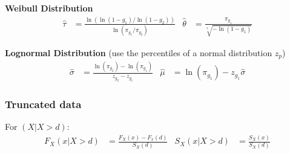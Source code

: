 \documentclass[10pt, french]{article}
\begin{document}
\begin{multicols*}{2}
\textbf{Weibull Distribution}
\begin{align*}
	\hat{\tau}
	&=	\frac{\ln\left(\ln(1 - g_{1})/\ln(1 - g_{2})\right)}{\ln(\pi_{g_{1}}/\pi_{g_{2}})}	&
	\hat{\theta}
	&=	\frac{\pi_{g_{1}}}{\sqrt[\hat{\tau}]{-\ln(1 - g_{1})}}
\end{align*}

\textbf{Lognormal Distribution} (use the percentiles of a normal distribution $z_{p}$)
\begin{align*}
	\hat{\sigma}
	&=	\frac{\ln(\pi_{g_{2}}) - \ln(\pi_{g_{1}})}{z_{g_{2}} - z_{g_{1}}}	&
	\hat{\mu}
	&=	\ln(\pi_{g_{1}}) - z_{g_{1}} \hat{\sigma}
\end{align*}

\subsubsection*{Truncated data}
For $(X | X > d)$:
\begin{align*}
	F_{X}(x | X > d)
	&=	\frac{F_{X}(x) - F_{x}(d)}{S_{X}(d)}	&
	S_{X}(x | X > d) 
	&=	\frac{S_{X}(x)}{S_{X}(d)}
\end{align*}
\end{multicols*}
\end{document}
